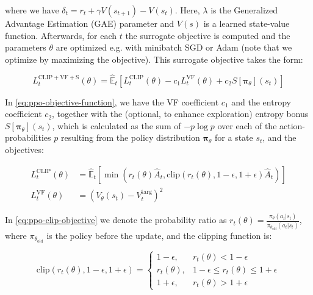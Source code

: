 \noindent where we have $\delta_{t} = r_{t} + \gamma V(s_{t+1}) - V(s_{t})$. Here, $\lambda$ is the Generalized Advantage Estimation (GAE) parameter and $V(s)$ is a learned state-value function. Afterwards, for each $t$ the surrogate objective is computed and the parameters $\theta$ are optimized e.g. with minibatch SGD or Adam (note that we optimize by maximizing the objective). This surrogate objective takes the form:

\begin{equation}
  L_{t}^{\text{CLIP} + \text{VF} + \text{S}}(\theta) = \hat{\mathbb{E}}_{t} \left[L_{t}^{\text{CLIP}}(\theta) - c_{1} L_{t}^{\text{VF}}(\theta) + c_{2} S[\boldsymbol{\pi}_{\theta}](s_{t})\right]
  \label{eq:ppo-objective-function}
\end{equation}

\noindent In \eqref{eq:ppo-objective-function}, we have the VF coefficient $c_{1}$ and the entropy coefficient $c_{2}$, together with the (optional, to enhance exploration) entropy bonus $S[\boldsymbol{\pi}_{\theta}](s_{t})$, which is calculated as the sum of $- p \log{p}$ over each of the action-probabilities $p$ resulting from the policy distribution $\boldsymbol{\pi}_{\theta}$ for a state $s_{t}$, and the objectives:

\begin{align}
  \label{eq:ppo-clip-objective} L_{t}^{\text{CLIP}}(\theta) &= \hat{\mathbb{E}}_{t}\left[\min\left(r_{t}(\theta) \hat{A}_{t}, \text{clip}\left(r_{t}(\theta), 1 - \epsilon, 1 + \epsilon\right) \hat{A}_{t}\right)\right]\\
  \label{eq:ppo-vf-objective} L_{t}^{\text{VF}}(\theta) &= \left(V_{\theta}(s_{t}) - V_{t}^{\text{targ}}\right)^{2}
\end{align}

\noindent In \eqref{eq:ppo-clip-objective} we denote the probability ratio as $r_{t}(\theta) = \frac{\pi_{\theta}\left(a_{t}|s_{t}\right)}{\pi_{\theta_{\text{old}}}(a_{t}|s_{t})}$, where $\pi_{\theta_{\text{old}}}$ is the policy before the update, and the clipping function is:

\begin{equation}
  \text{clip}\left(r_{t}(\theta), 1 - \epsilon, 1 + \epsilon\right) = \begin{cases}
    1 - \epsilon, &r_{t}(\theta) < 1 - \epsilon\\
    r_{t}(\theta), &1 - \epsilon \leq r_{t}(\theta) \leq 1 + \epsilon\\
    1 + \epsilon, &r_{t}(\theta) > 1 + \epsilon
  \end{cases}
  \label{eq:clipping-function}
\end{equation}

